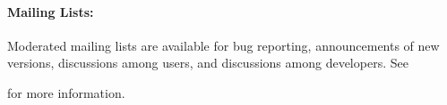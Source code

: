 \paragraph{Mailing Lists:}

Moderated mailing lists are available for bug reporting, announcements
of new versions, discussions among users, and discussions among
developers.  See
\begin{quote}
\end{quote}
for more
information.

\endinput


